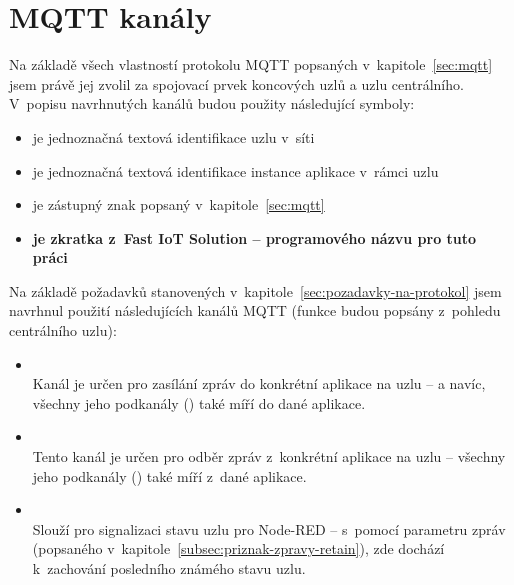 \section{MQTT kanály}\label{sec:mqtt-kanaly}
Na základě všech vlastností protokolu MQTT popsaných v~kapitole~\ref{sec:mqtt} jsem právě jej zvolil za spojovací
prvek koncových uzlů a uzlu centrálního. 
V~popisu navrhnutých kanálů budou použity následující symboly:
\begin{itemize}
    \item {} je jednoznačná textová identifikace uzlu v~síti
    \item {} je jednoznačná textová identifikace instance aplikace v~rámci uzlu
    \item \ic{\#} je zástupný znak popsaný v~kapitole~\ref{sec:mqtt}
    \item {} \textbf{je zkratka z~Fast IoT Solution -- programového názvu pro tuto práci}
\end{itemize}

Na základě požadavků stanovených v~kapitole~\ref{sec:pozadavky-na-protokol} jsem navrhnul použití následujících kanálů
MQTT (funkce budou popsány z~pohledu centrálního uzlu):

\begin{itemize}
    \item {} \\
    Kanál je určen pro zasílání zpráv do konkrétní aplikace na uzlu -- a navíc,
    všechny jeho podkanály () také míří do dané aplikace.

    \item {} \\
    Tento kanál je určen pro odběr zpráv z~konkrétní aplikace na uzlu --
    všechny jeho podkanály () také míří z~dané aplikace.

    \item {} \\
    Slouží pro signalizaci stavu uzlu pro Node-RED -- s~pomocí parametru zpráv  (popsaného
    v~kapitole~\ref{subsec:priznak-zpravy-retain}), zde dochází k~zachování posledního známého stavu uzlu.
\end{itemize}

